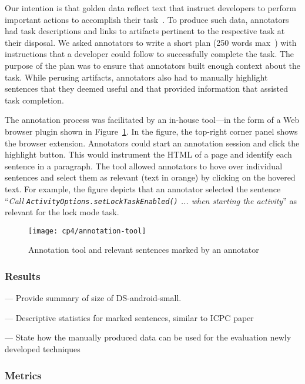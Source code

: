 Our intention is that golden data reflect text that instruct developers to perform important actions to accomplish their task~\cite{Robillard2015, Lotufo2012}.
To produce such data, annotators had task descriptions and links to artifacts pertinent to the respective task at their disposal. We asked annotators to write a short plan (250 words max~\cite{Rastkar2010}) with instructions that a developer could follow to successfully complete the task. 
The purpose of the plan was to ensure that annotators built enough context about the task.
While perusing artifacts, annotators also had to manually highlight sentences that they deemed useful and that provided information that assisted task completion. 


The annotation process was facilitated by an in-house tool---in the form of a Web browser plugin shown in Figure~\ref{fig:corpus-annotation-tool}. In the figure, the top-right corner panel shows the browser extension. Annotators could start an annotation session and click the highlight button.
This would instrument the HTML of a page and identify each sentence in a paragraph. The tool allowed annotators to hove over individual sentences and select them as relevant (text in orange) by clicking on the hovered text. For example, the figure depicts that an annotator selected  the sentence
``\textit{Call {\small \texttt{ActivityOptions.setLockTaskEnabled()}} ... when starting the activity}'' as relevant for the lock mode task.


\begin{figure}
    \centering
    \texttt{[image: cp4/annotation-tool]}
    \caption{Annotation tool and relevant sentences marked by an annotator}
    \label{fig:corpus-annotation-tool}
\end{figure}


\subsubsection{Results}

--- Provide summary of size of \acs{DS-android-small}. 

--- Descriptive statistics for marked sentences, similar to ICPC paper

--- State how the manually produced data can be used for the evaluation newly developed
techniques






\subsubsection{Metrics}

